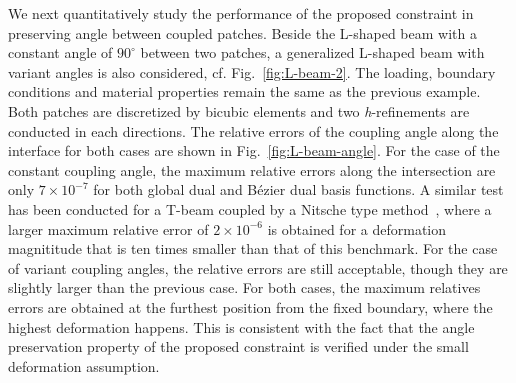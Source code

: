 \documentclass[preprint,12pt]{elsarticle}
\newcommand{\Bezier}{{B\'{e}zier} }
\theoremstyle{remark}
\begin{document}
We next quantitatively study the performance of the proposed constraint in preserving angle between coupled patches. Beside the L-shaped beam with a constant angle of $90^\circ$ between two patches, a generalized L-shaped beam with variant angles is also considered, cf. Fig.~\ref{fig:L-beam-2}. The loading, boundary conditions and material properties remain the same as the previous example. Both patches are discretized by bicubic elements and two \textit{h}-refinements are conducted in each directions. The relative errors of the coupling angle along the interface for both cases are shown in Fig.~\ref{fig:L-beam-angle}. For the case of the constant coupling angle, the maximum relative errors along the intersection are only $7\times10^{-7}$ for both global dual and \Bezier dual basis functions. A similar test has been conducted for a T-beam coupled by a Nitsche type method~\cite{guo_nitsches_2015}, where a larger maximum relative error of $2\times10^{-6}$ is obtained for a deformation magnititude that is ten times smaller than that of this benchmark. For the case of variant coupling angles, the relative errors are still acceptable, though they are slightly larger than the previous case. For both cases, the maximum relatives errors are obtained at the furthest position from the fixed boundary, where the highest deformation happens. This is consistent with the fact that the angle preservation property of the proposed constraint is verified under the small deformation assumption.
\end{document}
